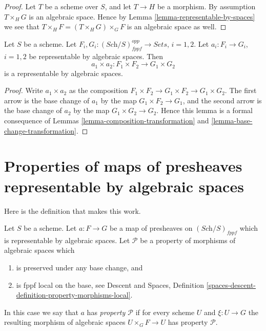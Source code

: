 \begin{proof}
Let $T$ be a scheme over $S$, and let $T \to H$ be a morphism.
By assumption $T \times_H G$ is an algebraic space. Hence by
Lemma \ref{lemma-representable-by-spaces}
we see that $T \times_H F = (T \times_H G) \times_G F$ is an
algebraic space as well.
\end{proof}

\begin{lemma}
\label{lemma-product-transformations}
Let $S$ be a scheme.
Let $F_i, G_i : (\textit{Sch}/S)_{fppf}^{opp} \to \textit{Sets}$, $i = 1, 2$.
Let $a_i : F_i \to G_i$, $i = 1, 2$
be representable by algebraic spaces.
Then
$$
a_1 \times a_2 : F_1 \times F_2 \longrightarrow G_1 \times G_2
$$
is a representable by algebraic spaces.
\end{lemma}

\begin{proof}
Write $a_1 \times a_2$ as the composition
$F_1 \times F_2 \to G_1 \times F_2 \to G_1 \times G_2$.
The first arrow is the base change of $a_1$ by the map
$G_1 \times F_2 \to G_1$, and the second arrow
is the base change of $a_2$ by the map
$G_1 \times G_2 \to G_2$. Hence this lemma is a formal
consequence of Lemmas \ref{lemma-composition-transformation}
and \ref{lemma-base-change-transformation}.
\end{proof}






\section{Properties of maps of presheaves representable by algebraic spaces}
\label{section-representable-by-spaces-properties}

\noindent
Here is the definition that makes this work.

\begin{definition}
\label{definition-property-transformation}
Let $S$ be a scheme. Let $a : F \to G$ be a map of presheaves on
$(\textit{Sch}/S)_{fppf}$ which is representable by algebraic spaces.
Let $\mathcal{P}$ be a property of morphisms of algebraic spaces which
\begin{enumerate}
\item is preserved under any base change, and
\item is fppf local on the base, see
Descent and Spaces,
Definition \ref{spaces-descent-definition-property-morphisms-local}.
\end{enumerate}
In this case we say that $a$ has {\it property $\mathcal{P}$} if for every
scheme $U$ and $\xi : U \to G$ the resulting morphism of algebraic spaces
$U \times_G F \to U$ has property $\mathcal{P}$.
\end{definition}

